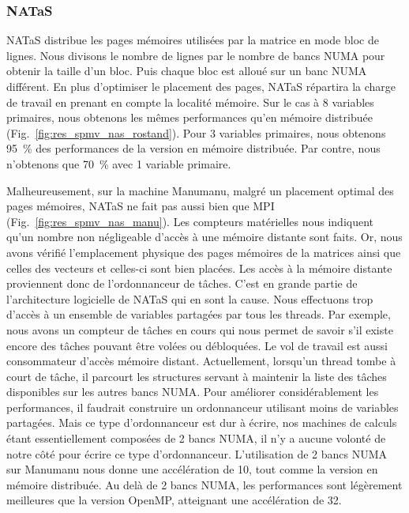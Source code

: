 \subsubsection{NATaS}
NATaS distribue les pages mémoires utilisées par la matrice en mode bloc de lignes.
%
Nous divisons le nombre de lignes par le nombre de bancs NUMA pour obtenir la taille d'un bloc.
%
Puis chaque bloc est alloué sur un banc NUMA différent.
%
En plus d'optimiser le placement des pages, NATaS répartira la charge de travail en prenant en compte la localité mémoire.
%
Sur le cas à 8 variables primaires, nous obtenons les mêmes performances qu'en mémoire distribuée (Fig.~\ref{fig:res_spmv_nas_rostand}).
%
Pour 3 variables primaires, nous obtenons 95~\% des performances de la version en mémoire distribuée.
%
Par contre, nous n'obtenons que 70~\% avec 1 variable primaire.



Malheureusement, sur la machine Manumanu, malgré un placement optimal des pages mémoires, NATaS ne fait pas aussi bien que MPI (Fig.~\ref{fig:res_spmv_nas_manu}).
%
Les compteurs matérielles nous indiquent qu'un nombre non négligeable d'accès à une mémoire distante sont faits.
%
Or, nous avons vérifié l'emplacement physique des pages mémoires de la matrices ainsi que celles des vecteurs et celles-ci sont bien placées.
%
Les accès à la mémoire distante proviennent donc de l'ordonnanceur de tâches.
%
C'est en grande partie de l'architecture logicielle de NATaS qui en sont la cause.
%
Nous effectuons trop d'accès à un ensemble de variables partagées par tous les threads.
%
Par exemple, nous avons un compteur de tâches en cours qui nous permet de savoir s'il existe encore des tâches pouvant être volées ou débloquées.
%
Le vol de travail est aussi consommateur d'accès mémoire distant.
%
Actuellement, lorsqu'un thread tombe à court de tâche, il parcourt les structures servant à maintenir la liste des tâches disponibles sur les autres bancs NUMA.
%
Pour améliorer considérablement les performances, il faudrait construire un ordonnanceur utilisant moins de variables partagées.
%
Mais ce type d'ordonnanceur est dur à écrire, nos machines de calculs étant essentiellement composées de 2 bancs NUMA, il n'y a aucune volonté de notre côté pour écrire ce type d'ordonnanceur.
%
L'utilisation de 2 bancs NUMA sur Manumanu nous donne une accélération de 10, tout comme la version en mémoire distribuée.
%
Au delà de 2 bancs NUMA, les performances sont légèrement meilleures que la version OpenMP, atteignant une accélération de 32.
